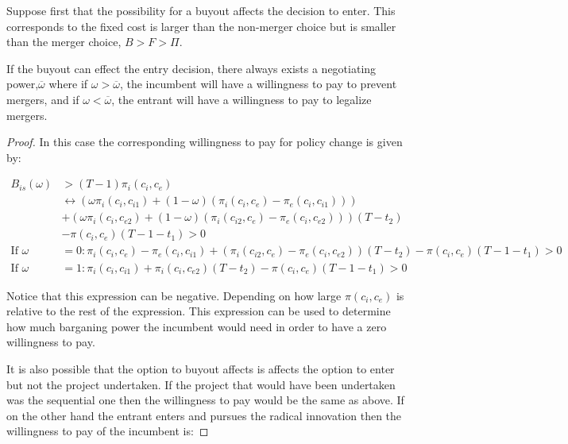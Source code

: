 Suppose first that the possibility for a buyout affects the decision to enter. This corresponds to the fixed cost is larger than the non-merger choice but is smaller than the merger choice, $B>F> \Pi$.

\begin{proposition}
If the buyout can effect the entry decision, there always exists a negotiating power,$\overline{\omega}$ where if $\omega > \overline{\omega}$, the incumbent will have a willingness to pay to prevent mergers, and if $\omega < \overline{\omega}$, the entrant will have a willingness to pay to legalize mergers. 
\end{proposition}

\begin{proof}
In this case the corresponding willingness to pay for policy change is given by:

\begin{align*}
B_{is}(\omega)&>(T-1) \pi_i(c_i,c_e) \\
& \leftrightarrow (\omega \pi_i(c_i,c_{i1})+(1-\omega)(\pi_i(c_i,c_{e})-\pi_e(c_i,c_{i1}))) \\
&+(\omega \pi_i(c_i,c_{e2})+(1-\omega)(\pi_i(c_{i2},c_e)-\pi_e(c_{i},c_{e2})))(T-t_2)
\\&- \pi(c_i,c_e)(T-1-t_1)>0 \\
\text{If }\omega &=0: \pi_i(c_i,c_{e})-\pi_e(c_i,c_{i1}) 
+(\pi_i(c_{i2},c_e)-\pi_e(c_{i},c_{e2}))(T-t_2)
- \pi(c_i,c_e)(T-1-t_1)>0 \\
\text{If }\omega &=1: \pi_i(c_i,c_{i1})
+\pi_i(c_i,c_{e2})(T-t_2)
- \pi(c_i,c_e)(T-1-t_1)>0 
\end{align*}

Notice that this expression can be negative. Depending on how large $\pi(c_i,c_e)$ is relative to the rest of the expression. This expression can be used to determine how much barganing power the incumbent would need in order to have a zero willingness to pay. 

It is also possible that the option to buyout affects is affects the option to enter but not the project undertaken. If the project that would have been undertaken was the sequential one then the willingness to pay would be the same as above. If on the other hand the entrant enters and pursues the radical innovation then the willingness to pay of the incumbent is: 


\end{proof}
